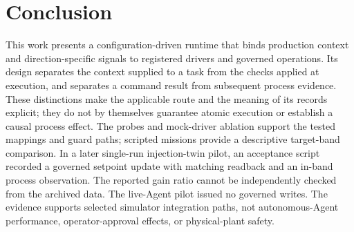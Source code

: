 \section{Conclusion}
\label{sec:conclusion}
This work presents a configuration-driven runtime that binds production context and direction-specific signals to registered drivers and governed operations. Its design separates the context supplied to a task from the checks applied at execution, and separates a command result from subsequent process evidence. These distinctions make the applicable route and the meaning of its records explicit; they do not by themselves guarantee atomic execution or establish a causal process effect. The probes and mock-driver ablation support the tested mappings and guard paths; scripted missions provide a descriptive target-band comparison. In a later single-run injection-twin pilot, an acceptance script recorded a governed setpoint update with matching readback and an in-band process observation. The reported gain ratio cannot be independently checked from the archived data. The live-Agent pilot issued no governed writes. The evidence supports selected simulator integration paths, not autonomous-Agent performance, operator-approval effects, or physical-plant safety.
